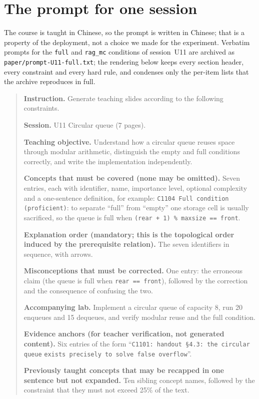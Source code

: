 \documentclass[11pt,a4paper]{article}
\newcommand{\id}[1]{\texttt{#1}}
\begin{document}
\section{The prompt for one session}
\label{sec:s7}

The course is taught in Chinese, so the prompt is written in Chinese; that is a
property of the deployment, not a choice we made for the experiment. Verbatim
prompts for the \id{full} and \id{rag\_mc} conditions of session~U11 are
archived as \id{paper/prompt-U11-full.txt}; the rendering below keeps every
section header, every constraint and every hard rule, and condenses only the
per-item lists that the archive reproduces in full.

\begin{quote}\small
\textbf{Instruction.} Generate teaching slides according to the following
constraints.

\textbf{Session.} U11 Circular queue (7 pages).

\textbf{Teaching objective.} Understand how a circular queue reuses space
through modular arithmetic, distinguish the empty and full conditions
correctly, and write the implementation independently.

\textbf{Concepts that must be covered (none may be omitted).} Seven entries,
each with identifier, name, importance level, optional complexity and a
one-sentence definition, for example:
\id{C1104 Full condition (proficient)}: to separate ``full'' from ``empty'' one
storage cell is usually sacrificed, so the queue is full when
\id{(rear + 1) \% maxsize == front}.

\textbf{Explanation order (mandatory; this is the topological order induced by
the prerequisite relation).} The seven identifiers in sequence, with arrows.

\textbf{Misconceptions that must be corrected.} One entry: the erroneous claim
(the queue is full when \id{rear == front}), followed by the correction and the
consequence of confusing the two.

\textbf{Accompanying lab.} Implement a circular queue of capacity 8, run 20
enqueues and 15 dequeues, and verify modular reuse and the full condition.

\textbf{Evidence anchors (for teacher verification, not generated content).}
Six entries of the form ``\id{C1101: handout \S4.3: the circular queue} \id{exists
precisely to solve false overflow}''.

\textbf{Previously taught concepts that may be recapped in one sentence but not
expanded.} Ten sibling concept names, followed by the constraint that they must
not exceed 25\% of the text.


\end{quote}
\end{document}
